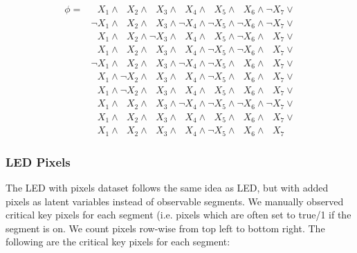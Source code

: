 \begin{align*}
\phi=
&\phantom{\neg}X_1 \wedge \phantom{\neg}X_2 \wedge \phantom{\neg}X_3 \wedge \phantom{\neg}X_4 \wedge \phantom{\neg}X_5 \wedge \phantom{\neg}X_6 \wedge \neg X_7 \vee\\
&\neg X_1 \wedge \phantom{\neg}X_2 \wedge \phantom{\neg}X_3 \wedge \neg X_4 \wedge \neg X_5 \wedge \neg X_6 \wedge \neg X_7 \vee\\
&\phantom{\neg}X_1 \wedge \phantom{\neg}X_2 \wedge \neg X_3 \wedge \phantom{\neg}X_4 \wedge \phantom{\neg}X_5 \wedge \neg X_6 \wedge \phantom{\neg}X_7 \vee\\
&\phantom{\neg}X_1 \wedge \phantom{\neg}X_2 \wedge \phantom{\neg}X_3 \wedge \phantom{\neg}X_4 \wedge \neg X_5 \wedge \neg X_6 \wedge \phantom{\neg}X_7 \vee\\
&\neg X_1 \wedge \phantom{\neg}X_2 \wedge \phantom{\neg}X_3 \wedge \neg X_4 \wedge \neg X_5 \wedge \phantom{\neg}X_6 \wedge \phantom{\neg}X_7 \vee\\
&\phantom{\neg}X_1 \wedge \neg X_2 \wedge \phantom{\neg}X_3 \wedge \phantom{\neg}X_4 \wedge \neg X_5 \wedge \phantom{\neg}X_6 \wedge \phantom{\neg}X_7 \vee\\
&\phantom{\neg}X_1 \wedge \neg X_2 \wedge \phantom{\neg}X_3 \wedge \phantom{\neg}X_4 \wedge \phantom{\neg}X_5 \wedge \phantom{\neg}X_6 \wedge \phantom{\neg}X_7 \vee\\
&\phantom{\neg}X_1 \wedge \phantom{\neg}X_2 \wedge \phantom{\neg}X_3 \wedge \neg X_4 \wedge \neg X_5 \wedge \neg X_6 \wedge \neg X_7 \vee\\
&\phantom{\neg}X_1 \wedge \phantom{\neg}X_2 \wedge \phantom{\neg}X_3 \wedge \phantom{\neg}X_4 \wedge \phantom{\neg}X_5 \wedge \phantom{\neg}X_6 \wedge \phantom{\neg}X_7 \vee\\
&\phantom{\neg}X_1 \wedge \phantom{\neg}X_2 \wedge \phantom{\neg}X_3 \wedge \phantom{\neg}X_4 \wedge \neg X_5 \wedge \phantom{\neg}X_6 \wedge \phantom{\neg}X_7
\end{align*}

\subsubsection{LED Pixels}

The LED with pixels dataset follows the same idea as LED, but with added pixels as latent variables
instead of observable segments. We manually observed critical key pixels for each segment (i.e.
pixels which are often set to true/1 if the segment is on. We count pixels row-wise from top left
to bottom right. The following are the critical key pixels for each segment:

